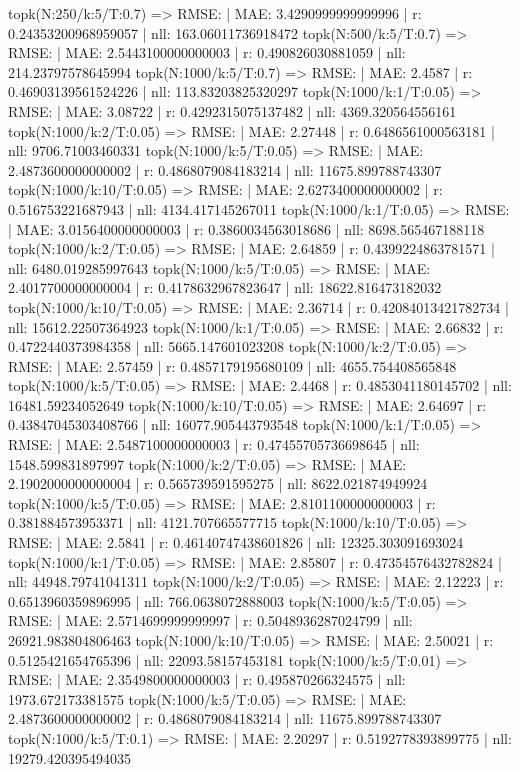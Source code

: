 topk(N:250/k:5/T:0.7) => RMSE: | MAE: 3.4290999999999996 | r: 0.24353200968959057 | nll: 163.06011736918472
topk(N:500/k:5/T:0.7) => RMSE: | MAE: 2.5443100000000003 | r: 0.490826030881059 | nll: 214.23797578645994
topk(N:1000/k:5/T:0.7) => RMSE: | MAE: 2.4587 | r: 0.46903139561524226 | nll: 113.83203825320297
topk(N:1000/k:1/T:0.05) => RMSE: | MAE: 3.08722 | r: 0.4292315075137482 | nll: 4369.320564556161
topk(N:1000/k:2/T:0.05) => RMSE: | MAE: 2.27448 | r: 0.6486561000563181 | nll: 9706.71003460331
topk(N:1000/k:5/T:0.05) => RMSE: | MAE: 2.4873600000000002 | r: 0.4868079084183214 | nll: 11675.899788743307
topk(N:1000/k:10/T:0.05) => RMSE: | MAE: 2.6273400000000002 | r: 0.516753221687943 | nll: 4134.417145267011
topk(N:1000/k:1/T:0.05) => RMSE: | MAE: 3.0156400000000003 | r: 0.3860034563018686 | nll: 8698.565467188118
topk(N:1000/k:2/T:0.05) => RMSE: | MAE: 2.64859 | r: 0.4399224863781571 | nll: 6480.019285997643
topk(N:1000/k:5/T:0.05) => RMSE: | MAE: 2.4017700000000004 | r: 0.4178632967823647 | nll: 18622.816473182032
topk(N:1000/k:10/T:0.05) => RMSE: | MAE: 2.36714 | r: 0.42084013421782734 | nll: 15612.22507364923
topk(N:1000/k:1/T:0.05) => RMSE: | MAE: 2.66832 | r: 0.4722440373984358 | nll: 5665.147601023208
topk(N:1000/k:2/T:0.05) => RMSE: | MAE: 2.57459 | r: 0.4857179195680109 | nll: 4655.754408565848
topk(N:1000/k:5/T:0.05) => RMSE: | MAE: 2.4468 | r: 0.4853041180145702 | nll: 16481.59234052649
topk(N:1000/k:10/T:0.05) => RMSE: | MAE: 2.64697 | r: 0.43847045303408766 | nll: 16077.905443793548
topk(N:1000/k:1/T:0.05) => RMSE: | MAE: 2.5487100000000003 | r: 0.47455705736698645 | nll: 1548.599831897997
topk(N:1000/k:2/T:0.05) => RMSE: | MAE: 2.1902000000000004 | r: 0.565739591595275 | nll: 8622.021874949924
topk(N:1000/k:5/T:0.05) => RMSE: | MAE: 2.8101100000000003 | r: 0.381884573953371 | nll: 4121.707665577715
topk(N:1000/k:10/T:0.05) => RMSE: | MAE: 2.5841 | r: 0.46140747438601826 | nll: 12325.303091693024
topk(N:1000/k:1/T:0.05) => RMSE: | MAE: 2.85807 | r: 0.47354576432782824 | nll: 44948.79741041311
topk(N:1000/k:2/T:0.05) => RMSE: | MAE: 2.12223 | r: 0.6513960359896995 | nll: 766.0638072888003
topk(N:1000/k:5/T:0.05) => RMSE: | MAE: 2.5714699999999997 | r: 0.5048936287024799 | nll: 26921.983804806463
topk(N:1000/k:10/T:0.05) => RMSE: | MAE: 2.50021 | r: 0.5125421654765396 | nll: 22093.58157453181
topk(N:1000/k:5/T:0.01) => RMSE: | MAE: 2.3549800000000003 | r: 0.495870266324575 | nll: 1973.672173381575
topk(N:1000/k:5/T:0.05) => RMSE: | MAE: 2.4873600000000002 | r: 0.4868079084183214 | nll: 11675.899788743307
topk(N:1000/k:5/T:0.1) => RMSE: | MAE: 2.20297 | r: 0.5192778393899775 | nll: 19279.420395494035
